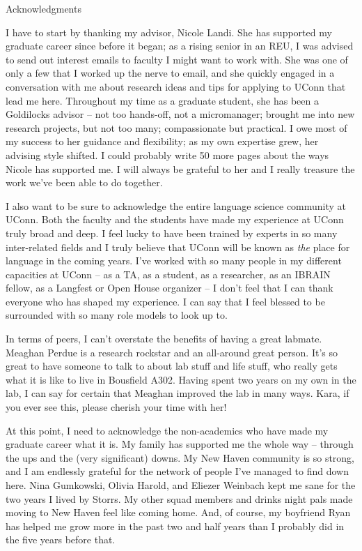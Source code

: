 \documentclass[../dissertation.tex]{subfiles}
\begin{document}
\begin{center} Acknowledgments
\end{center}
	I have to start by thanking my advisor, Nicole Landi. She has supported my graduate career since before it began; as a rising senior in an REU, I was advised to send out interest emails to faculty I might want to work with. She was one of only a few that I worked up the nerve to email, and she quickly engaged in a conversation with me about research ideas and tips for applying to UConn that lead me here. Throughout my time as a graduate student, she has been a Goldilocks advisor -- not too hands-off, not a micromanager; brought me into new research projects, but not too many; compassionate but practical. I owe most of my success to her guidance and flexibility; as my own expertise grew, her advising style shifted. I could probably write 50 more pages about the ways Nicole has supported me. I will always be grateful to her and I really treasure the work we've been able to do together. \par 
	I also want to be sure to acknowledge the entire language science community at UConn. Both the faculty and the students have made my experience at UConn truly broad and deep. I feel lucky to have been trained by experts in so many inter-related fields and I truly believe that UConn will be known as \textit{the} place for language in the coming years. I've worked with so many people in my different capacities at UConn -- as a TA, as a student, as a researcher, as an IBRAIN fellow, as a Langfest or Open House organizer -- I don't feel that I can thank everyone who has shaped my experience. I can say that I feel blessed to be surrounded with so many role models to look up to. \par 
	In terms of peers, I can't overstate the benefits of having a great labmate. Meaghan Perdue is a research rockstar and an all-around great person. It's so great to have someone to talk to about lab stuff and life stuff, who really gets what it is like to live in Bousfield A302. Having spent two years on my own in the lab, I can say for certain that Meaghan improved the lab in many ways. Kara, if you ever see this, please cherish your time with her! \par 
	At this point, I need to acknowledge the non-academics who have made my graduate career what it is. My family has supported me the whole way -- through the ups and the (very significant) downs. My New Haven community is so strong, and I am endlessly grateful for the network of people I've managed to find down here. Nina Gumkowski, Olivia Harold, and Eliezer Weinbach kept me sane for the two years I lived by Storrs. My other squad members and drinks night pals made moving to New Haven feel like coming home. And, of course, my boyfriend Ryan has helped me grow more in the past two and half years than I probably did in the five years before that. \par 
\end{document}
